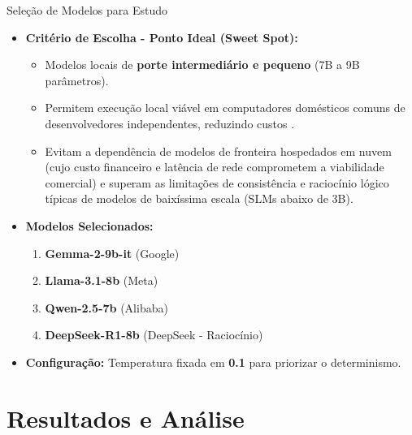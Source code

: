 \documentclass[11pt]{beamer}
\begin{document}
\begin{frame}{Seleção de Modelos para Estudo}
\begin{itemize}
    \item \textbf{Critério de Escolha - Ponto Ideal (Sweet Spot):}
    \begin{itemize}
        \item Modelos locais de \textbf{porte intermediário e pequeno} (7B a 9B parâmetros).
        \item Permitem execução local viável em computadores domésticos comuns de desenvolvedores independentes, reduzindo custos \cite{cao2026task}.
        \item Evitam a dependência de modelos de fronteira hospedados em nuvem (cujo custo financeiro e latência de rede comprometem a viabilidade comercial) e superam as limitações de consistência e raciocínio lógico típicas de modelos de baixíssima escala (SLMs abaixo de 3B).
    \end{itemize}
    \item \textbf{Modelos Selecionados:}
    \begin{enumerate}
        \item \textbf{Gemma-2-9b-it} (Google)
        \item \textbf{Llama-3.1-8b} (Meta)
        \item \textbf{Qwen-2.5-7b} (Alibaba)
        \item \textbf{DeepSeek-R1-8b} (DeepSeek - Raciocínio)
    \end{enumerate}
    \item \textbf{Configuração:} Temperatura fixada em \textbf{0.1} para priorizar o determinismo.
\end{itemize}
\end{frame}

\section{Resultados e Análise}
\end{document}
